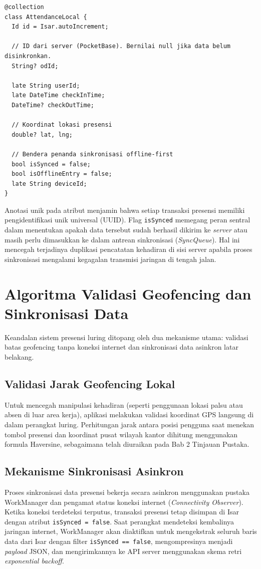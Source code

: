 \begin{lstlisting}
@collection
class AttendanceLocal {
  Id id = Isar.autoIncrement;
  
  // ID dari server (PocketBase). Bernilai null jika data belum disinkronkan.
  String? odId;           
  
  late String userId;
  late DateTime checkInTime;
  DateTime? checkOutTime;
  
  // Koordinat lokasi presensi
  double? lat, lng;       
  
  // Bendera penanda sinkronisasi offline-first
  bool isSynced = false;  
  bool isOfflineEntry = false;
  late String deviceId;
}
\end{lstlisting}

Anotasi unik pada atribut menjamin bahwa setiap transaksi presensi memiliki pengidentifikasi unik universal (UUID). Flag \texttt{isSynced} memegang peran sentral dalam menentukan apakah data tersebut sudah berhasil dikirim ke \textit{server} atau masih perlu dimasukkan ke dalam antrean sinkronisasi (\textit{SyncQueue}). Hal ini mencegah terjadinya duplikasi pencatatan kehadiran di sisi server apabila proses sinkronisasi mengalami kegagalan transmisi jaringan di tengah jalan.

\section{Algoritma Validasi Geofencing dan Sinkronisasi Data}
Keandalan sistem presensi luring ditopang oleh dua mekanisme utama: validasi batas geofencing tanpa koneksi internet dan sinkronisasi data asinkron latar belakang.

\subsection{Validasi Jarak Geofencing Lokal}
Untuk mencegah manipulasi kehadiran (seperti penggunaan lokasi palsu atau absen di luar area kerja), aplikasi melakukan validasi koordinat GPS langsung di dalam perangkat luring. Perhitungan jarak antara posisi pengguna saat menekan tombol presensi dan koordinat pusat wilayah kantor dihitung menggunakan formula Haversine, sebagaimana telah diuraikan pada Bab 2 Tinjauan Pustaka.

\subsection{Mekanisme Sinkronisasi Asinkron}
Proses sinkronisasi data presensi bekerja secara asinkron menggunakan pustaka WorkManager dan pengamat status koneksi internet (\textit{Connectivity Observer}). Ketika koneksi terdeteksi terputus, transaksi presensi tetap disimpan di Isar dengan atribut \texttt{isSynced = false}. Saat perangkat mendeteksi kembalinya jaringan internet, WorkManager akan diaktifkan untuk mengekstrak seluruh baris data dari Isar dengan filter \texttt{isSynced == false}, mengompresinya menjadi \textit{payload} JSON, dan mengirimkannya ke API server menggunakan skema retri \textit{exponential backoff}.

